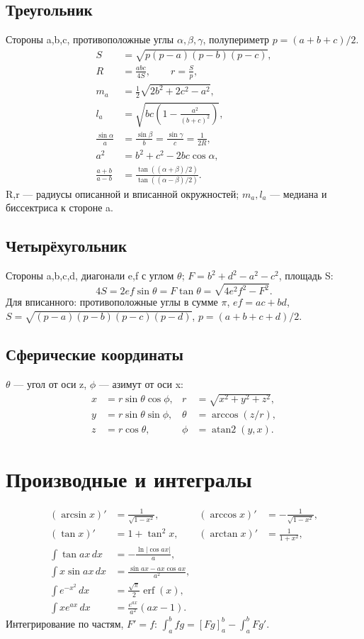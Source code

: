 \subsection{Треугольник}
Стороны a,b,c, противоположные углы $\alpha,\beta,\gamma$,
полупериметр $p=(a+b+c)/2$.
\begin{align*}
S&=\sqrt{p(p-a)(p-b)(p-c)},\\
R&=\frac{abc}{4S},\qquad r=\frac Sp,\\
m_a&=\tfrac12\sqrt{2b^2+2c^2-a^2},\\
l_a&=\sqrt{bc\left(1-\frac{a^2}{(b+c)^2}\right)},\\
\frac{\sin\alpha}{a}&=\frac{\sin\beta}{b}=\frac{\sin\gamma}{c}=\frac1{2R},\\
a^2&=b^2+c^2-2bc\cos\alpha,\\
\frac{a+b}{a-b}&=\frac{\tan((\alpha+\beta)/2)}{\tan((\alpha-\beta)/2)}.
\end{align*}
R,r — радиусы описанной и вписанной окружностей;
$m_a,l_a$ — медиана и биссектриса к стороне a.
\subsection{Четырёхугольник}
Стороны a,b,c,d, диагонали e,f с углом $\theta$;
$F=b^2+d^2-a^2-c^2$, площадь S:
\[4S=2ef\sin\theta=F\tan\theta=\sqrt{4e^2f^2-F^2}.\]
Для вписанного: противоположные углы в сумме $\pi$,
$ef=ac+bd$, $S=\sqrt{(p-a)(p-b)(p-c)(p-d)}$,
$p=(a+b+c+d)/2$.
\subsection{Сферические координаты}
$\theta$ — угол от оси z, $\phi$ — азимут от оси x:
\begin{align*}
x&=r\sin\theta\cos\phi,& r&=\sqrt{x^2+y^2+z^2},\\
y&=r\sin\theta\sin\phi,& \theta&=\arccos(z/r),\\
z&=r\cos\theta,&\phi&=\operatorname{atan2}(y,x).
\end{align*}
\section{Производные и интегралы}
\begin{align*}
(\arcsin x)'&=\frac1{\sqrt{1-x^2}},&
(\arccos x)'&=-\frac1{\sqrt{1-x^2}},\\
(\tan x)'&=1+\tan^2x,&(\arctan x)'&=\frac1{1+x^2},\\
\int\tan ax\,dx&=-\frac{\ln|\cos ax|}{a},\\
\int x\sin ax\,dx&=\frac{\sin ax-ax\cos ax}{a^2},\\
\int e^{-x^2}\,dx&=\frac{\sqrt\pi}{2}\operatorname{erf}(x),\\
\int xe^{ax}\,dx&=\frac{e^{ax}}{a^2}(ax-1).
\end{align*}
Интегрирование по частям, $F'=f$:
$\int_a^bfg=[Fg]_a^b-\int_a^bFg'$.
